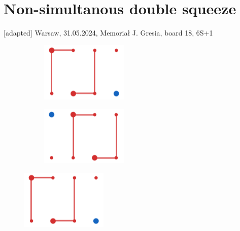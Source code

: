 \documentclass[14pt, a4paper]{extreport}
\begin{document}
\newpage
\section*{Non-simultanous double squeeze}
[adapted] Warsaw, 31.05.2024, Memoriał J. Gresia, board 18, 6\ntx{}S+1

\vspace{0.7cm}
\begin{figure}[H]
    \centering
    \begin{subfigure}{0.4\textwidth}
        \centering
        \includegraphics[scale=0.7]{./squeezes/nonsim-double.png}
    \end{subfigure}
    \begin{subfigure}{0.4\textwidth}
        \centering
        \includegraphics[scale=0.7]{./squeezes/nonsim-double-reverted.png}
    \end{subfigure}
\end{figure}

\handdiagramv
        {}
        {}
        {}
        {}
        {}

\vspace{0.3cm}

\hspace{5.8cm}\hspace{0.4cm}\hspace{0.4cm}\hspace{0.4cm}
\vspace{-0.4cm}
\begin{figure}[H]
    \centering
    \includegraphics[scale=0.7]{./squeezes/nonsim-double.png}
\end{figure}
\vspace{-0.9cm}
\hspace{5.8cm}\hspace{0.4cm}\hspace{0.4cm}\hspace{0.4cm}
\end{document}
